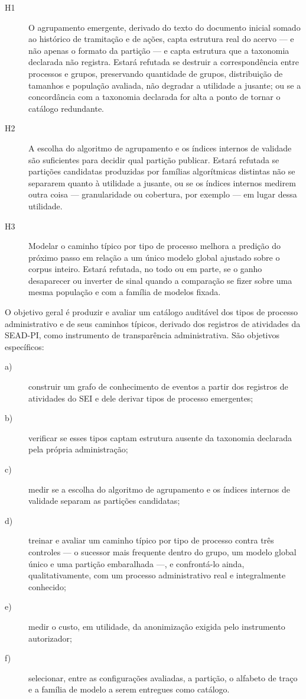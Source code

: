 \begin{description}
  \item[H1] O agrupamento emergente, derivado do texto do documento inicial somado ao histórico
    de tramitação e de ações, capta estrutura real do acervo --- e não apenas o formato da
    partição --- e capta estrutura que a taxonomia declarada não registra. Estará refutada se
    destruir a correspondência entre processos e grupos, preservando quantidade de grupos,
    distribuição de tamanhos e população avaliada, não degradar a utilidade a jusante; ou se a
    concordância com a taxonomia declarada for alta a ponto de tornar o catálogo redundante.
  \item[H2] A escolha do algoritmo de agrupamento e os índices internos de validade são
    suficientes para decidir qual partição publicar. Estará refutada se partições candidatas
    produzidas por famílias algorítmicas distintas não se separarem quanto à utilidade a jusante,
    ou se os índices internos medirem outra coisa --- granularidade ou cobertura, por exemplo ---
    em lugar dessa utilidade.
  \item[H3] Modelar o caminho típico por tipo de processo melhora a predição do próximo passo em
    relação a um único modelo global ajustado sobre o corpus inteiro. Estará refutada, no todo ou
    em parte, se o ganho desaparecer ou inverter de sinal quando a comparação se fizer sobre uma
    mesma população e com a família de modelos fixada.
\end{description}

O objetivo geral é produzir e avaliar um catálogo auditável dos tipos de processo administrativo
e de seus caminhos típicos, derivado dos registros de atividades da SEAD-PI, como instrumento de
transparência administrativa. São objetivos específicos:

\begin{description}
  \item[a)] construir um grafo de conhecimento de eventos a partir dos registros de atividades do SEI e dele derivar
    tipos de processo emergentes;
  \item[b)] verificar se esses tipos captam estrutura ausente da taxonomia declarada pela própria
    administração;
  \item[c)] medir se a escolha do algoritmo de agrupamento e os índices internos de validade
    separam as partições candidatas;
  \item[d)] treinar e avaliar um caminho típico por tipo de processo contra três controles ---
    o sucessor mais frequente dentro do grupo, um modelo global único e uma partição embaralhada
    ---, e confrontá-lo ainda, qualitativamente, com um processo administrativo real e
    integralmente conhecido;
  \item[e)] medir o custo, em utilidade, da anonimização exigida pelo instrumento autorizador;
  \item[f)] selecionar, entre as configurações avaliadas, a partição, o alfabeto de traço e a
    família de modelo a serem entregues como catálogo.
\end{description}


